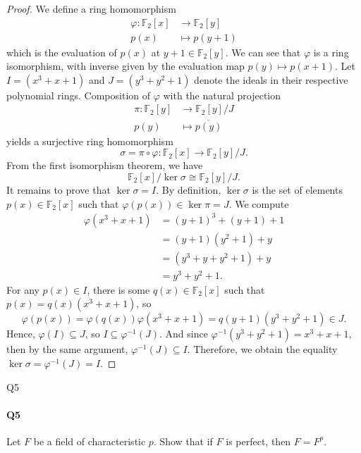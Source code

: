 \documentclass[12pt]{article}
\newenvironment{fullbox}{\begin{lrbox}{\savefullbox}\begin{minipage}{\dimexpr\textwidth-2\fboxsep\relax}}{\end{minipage}\end{lrbox}\begin{center}\framebox[\textwidth]{\usebox{\savefullbox}}\end{center}}
\newenvironment{pbox}[1][]{\begin{fullbox}\ifx#1\empty\else\paragraph{#1}\fi}{\end{fullbox}}
\theoremstyle{definition}
\renewcommand{\phi}{\varphi}
\newcommand{\isom}{\cong}
\newcommand{\eqc}{\overline}
\newcommand{\F}{\mathbb{F}}
\begin{document}
\begin{proof}
    We define a ring homomorphism
    \begin{align*}
        \phi : \F_2[x] &\to \F_2[y] \\
            p(x) &\mapsto p(y + 1)
    \end{align*}
    which is the evaluation of $p(x)$ at $y + 1 \in \F_2[y]$. We can see that $\phi$ is a ring isomorphism, with inverse given by the evaluation map $p(y) \mapsto p(x + 1)$. Let $I = (x^3 + x + 1)$ and $J = (y^3 + y^2 + 1)$ denote the ideals in their respective polynomial rings. Composition of $\phi$ with the natural projection
    \begin{align*}
        \pi : \F_2[y] &\to \F_2[y]/J \\
            p(y) &\mapsto \eqc{p(y)}
    \end{align*}
    yields a surjective ring homomorphism
    \[
        \sigma = \pi \circ \phi : \F_2[x] \to \F_2[y]/J.
    \]
    From the first isomorphism theorem, we have
    \[
        \F_2[x]/\ker \sigma \isom \F_2[y]/J.
    \]
    It remains to prove that $\ker \sigma = I$. By definition, $\ker \sigma$ is the set of elements $p(x) \in \F_2[x]$ such that $\phi(p(x)) \in \ker \pi = J$. We compute
    \begin{align*}
        \phi(x^3 + x + 1)
            &= (y + 1)^3 + (y + 1) + 1 \\
            &= (y + 1)(y^2 + 1) + y \\
            &= (y^3 + y + y^2 + 1) + y \\
            &= y^3 + y^2 + 1.
    \end{align*}
    For any $p(x) \in I$, there is some $q(x) \in \F_2[x]$ such that $p(x) = q(x)(x^3 + x + 1)$, so
    \[
        \phi(p(x)) 
            = \phi(q(x))\phi(x^3 + x + 1)
            = q(y + 1)(y^3 + y^2 + 1)
            \in J.
    \]
    Hence, $\phi(I) \subseteq J$, so $I \subseteq \phi^{-1}(J)$. And since $\phi^{-1}(y^3 + y^2 + 1) = x^3 + x + 1$, then by the same argument, $\phi^{-1}(J) \subseteq I$. Therefore, we obtain the equality $\ker \sigma = \phi^{-1}(J) = I$.

\end{proof}


\newpage
\begin{pbox}[Q5]
    Let $F$ be a field of characteristic $p$. Show that if $F$ is perfect, then $F = F^p$.
\end{pbox}
\end{document}
